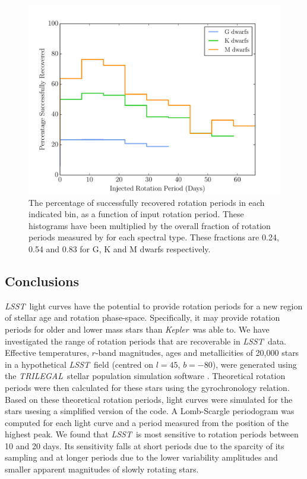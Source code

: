 \documentclass[useAMS, usenatbib, preprint, 12pt]{aastex}
\newcommand{\kepler}{{\it Kepler}}
\newcommand{\LSST}{{\it LSST}}
\newcommand{\trilegal}{{\it TRILEGAL}}
\begin{document}
\begin{figure}
\begin{center}
\includegraphics[width=6in, clip=true]{figures/recovered_hist_-10.pdf}
\caption[\LSST\ rotation period recovery results for different spectral types]
{The percentage of successfully recovered rotation periods in each indicated
bin, as a function of input rotation period.
These histograms have been multiplied by the overall fraction of rotation
periods measured by \citet{Mcquillan2014} for each spectral type.
These fractions are 0.24, 0.54 and 0.83 for G, K and M dwarfs respectively.}
\label{fig:kickass}
\end{center}
\end{figure}

\subsection{Conclusions}

\LSST\ light curves have the potential to provide rotation periods for a new
region of stellar age and rotation phase-space.
Specifically, it may provide rotation periods for older and lower mass stars
than \kepler\ was able to.
We have investigated the range of rotation periods that are recoverable in
\LSST\ data.
Effective temperatures, $r$-band magnitudes, ages and metallicities of 20,000
stars in a hypothetical \LSST\ field (centred on $l=45$, $b=-80$), were
generated using the \trilegal\ stellar population simulation software
\citep{Girardi2012}.
Theoretical rotation periods were then calculated for these stars using the
\citep{Angus2015} gyrochronology relation.
Based on these theoretical rotation periods, light curves were simulated for
the stars usesing a simplified version of the \citep{Aigrain2015} code.
A Lomb-Scargle periodogram was computed for each light curve and a period
measured from the position of the highest peak.
We found that \LSST\ is most sensitive to rotation periods between 10 and 20
days.
Its sensitivity falls at short periods due to the sparcity of its sampling and
at longer periods due to the lower variability amplitudes and smaller apparent
magnitudes of slowly rotating stars.
\end{document}
